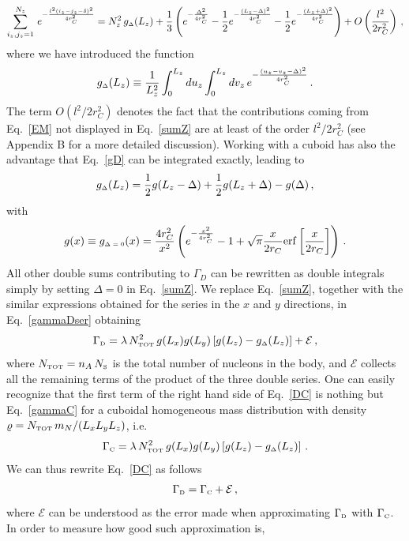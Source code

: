 \documentclass[11pt,onecolumn,amssymb,nofootinbib]{revtex4}
\newcommand\beq{\begin{equation}}
\newcommand\eeq{\end{equation}}
\begin{document}
\beq\label{sumZ}
\sum_{i_z,j_z=1}^{N_z}\,e^{-\frac{l^2(i_z-j_z-\delta)^2}{4r_C^2}}= N_z^2\,g_{\text{\tiny{$\Delta$}}}(L_z)+\frac{1}{3}\left(e^{-\frac{\Delta^2}{4r_C^2}}-\frac{1}{2}e^{-\frac{(L_z-\Delta)^2}{4r_C^2}}-\frac{1}{2}e^{-\frac{(L_z+\Delta)^2}{4r_C^2}}\right)+O\left(\frac{l^2}{2r_C^2}\right)\,,%
\eeq
where we have introduced the function
\beq\label{gD}
g_{\text{\tiny{$\Delta$}}}(L_z)\equiv \frac{1}{L_z^2}\int_0^{L_z}du_z\int_0^{L_z}dv_z\,e^{-\frac{(u_z-v_z-\Delta)^2}{4r_C^2}}\,.
\eeq 
The term $O(l^2/2r_C^2)$ denotes the fact that the contributions coming from Eq.~\eqref{EM} not displayed in Eq.~\eqref{sumZ} are at least of the order $l^2/2r_C^2$ (see Appendix B for a more detailed discussion).
Working with a cuboid has also the advantage that Eq.~\eqref{gD} can be integrated exactly, leading to
 \beq\label{gDelta}
g_{\text{\tiny{$\Delta$}}}(L_z)=\frac{1}{2}g(L_z-\Delta)+\frac{1}{2}g(L_z+\Delta)-g(\Delta)\,,
\eeq
with
 \beq\label{gfac}
g(x)\equiv g_{\text{\tiny{$\Delta=0$}}}(x)=\frac{4r_C^2}{x^2}\left(e^{-\frac{x^2}{4r_C^2}}-1+\sqrt{\pi}\frac{x}{2r_C}\mathrm{erf}\left[\frac{x}{2r_C}\right]\right)\,.
\eeq
All other double sums contributing to $\Gamma_D$ can be rewritten as double integrals simply by setting $\Delta=0$ in Eq.~\eqref{sumZ}. We replace Eq.~\eqref{sumZ}, together with the similar expressions obtained for the series in the $x$ and $y$ directions, in Eq.~\eqref{gammaDser} obtaining
\beq\label{DC}
\Gamma_\text{\tiny{D}}=\lambda \,N_{\text{\tiny{TOT}}}^2\, g(L_x)g(L_y)\left[g(L_z)-g_{\text{\tiny{$\Delta$}}}(L_z)\right]+\mathcal{E}\,,
\eeq
where $N_{\text{\tiny{TOT}}}=n_A\,N_{\text{\tiny{S}}}$ is the total number of nucleons in the body, and $\mathcal{E}$ collects all the remaining terms of the product of the three double series. %
One can easily recognize that the first term of the right hand side of Eq.~\eqref{DC} is nothing but Eq.~\eqref{gammaC} for a cuboidal homogeneous mass distribution with density $\varrho=N_{\text{\tiny{TOT}}}\,m_N/(L_xL_yL_z)$, i.e.
\beq\label{gammacuboid}
\Gamma_\text{\tiny{C}}=\lambda \,N_{\text{\tiny{TOT}}}^2\, g(L_x)g(L_y)\left[g(L_z)-g_{\text{\tiny{$\Delta$}}}(L_z)\right]\,.
\eeq
We can thus rewrite Eq.~\eqref{DC} as follows
\beq\label{gammaDvsC}
\Gamma_\text{\tiny{D}}=\Gamma_\text{\tiny{C}}+\mathcal{E}\,,
\eeq
where $\mathcal{E}$ can be understood as the error made when approximating $\Gamma_\text{\tiny{D}}$ with $\Gamma_\text{\tiny{C}}$. In order to measure how good such approximation is, %
\end{document}
